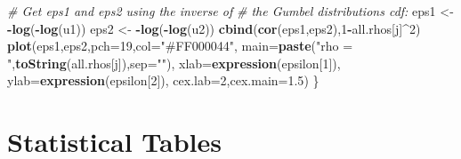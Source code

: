 \documentclass[
  12pt,
]{book}
\newenvironment{Shaded}{\begin{snugshade}}{\end{snugshade}}
\newcommand{\AttributeTok}[1]{\textcolor[rgb]{0.13,0.29,0.53}{#1}}
\newcommand{\CommentTok}[1]{\textcolor[rgb]{0.56,0.35,0.01}{\textit{#1}}}
\newcommand{\DecValTok}[1]{\textcolor[rgb]{0.00,0.00,0.81}{#1}}
\newcommand{\FloatTok}[1]{\textcolor[rgb]{0.00,0.00,0.81}{#1}}
\newcommand{\FunctionTok}[1]{\textcolor[rgb]{0.13,0.29,0.53}{\textbf{#1}}}
\newcommand{\NormalTok}[1]{#1}
\newcommand{\OtherTok}[1]{\textcolor[rgb]{0.56,0.35,0.01}{#1}}
\newcommand{\SpecialCharTok}[1]{\textcolor[rgb]{0.81,0.36,0.00}{\textbf{#1}}}
\newcommand{\StringTok}[1]{\textcolor[rgb]{0.31,0.60,0.02}{#1}}
\theoremstyle{definition}
\theoremstyle{definition}
\theoremstyle{definition}
\theoremstyle{definition}
\theoremstyle{remark}
\begin{document}
\begin{Shaded}
\begin{Highlighting}[]
  \CommentTok{\# Get eps1 and eps2 using the inverse of}
  \CommentTok{\# the Gumbel distribution\textquotesingle{}s cdf:}
\NormalTok{  eps1 }\OtherTok{\textless{}{-}} \SpecialCharTok{{-}}\FunctionTok{log}\NormalTok{(}\SpecialCharTok{{-}}\FunctionTok{log}\NormalTok{(u1))}
\NormalTok{  eps2 }\OtherTok{\textless{}{-}} \SpecialCharTok{{-}}\FunctionTok{log}\NormalTok{(}\SpecialCharTok{{-}}\FunctionTok{log}\NormalTok{(u2))}
  \FunctionTok{cbind}\NormalTok{(}\FunctionTok{cor}\NormalTok{(eps1,eps2),}\DecValTok{1}\SpecialCharTok{{-}}\NormalTok{all.rhos[j]}\SpecialCharTok{\^{}}\DecValTok{2}\NormalTok{)}
  \FunctionTok{plot}\NormalTok{(eps1,eps2,}\AttributeTok{pch=}\DecValTok{19}\NormalTok{,}\AttributeTok{col=}\StringTok{"\#FF000044"}\NormalTok{,}
       \AttributeTok{main=}\FunctionTok{paste}\NormalTok{(}\StringTok{"rho = "}\NormalTok{,}\FunctionTok{toString}\NormalTok{(all.rhos[j]),}\AttributeTok{sep=}\StringTok{""}\NormalTok{),}
       \AttributeTok{xlab=}\FunctionTok{expression}\NormalTok{(epsilon[}\DecValTok{1}\NormalTok{]),}
       \AttributeTok{ylab=}\FunctionTok{expression}\NormalTok{(epsilon[}\DecValTok{2}\NormalTok{]),}
       \AttributeTok{cex.lab=}\DecValTok{2}\NormalTok{,}\AttributeTok{cex.main=}\FloatTok{1.5}\NormalTok{)}
\NormalTok{\}}
\end{Highlighting}
\end{Shaded}

\hypertarget{statistical-tables}{%
\section{Statistical Tables}\label{statistical-tables}}
\end{document}
